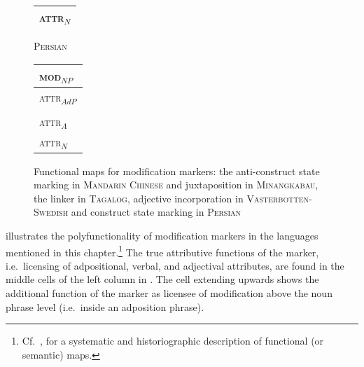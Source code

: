 \begin{figure}
{\begin{center}
\begin{tabular}{| l |}
\hline
\textsc{attr}$_{N}$\\
\hline
\end{tabular}
\end{center}
}
\parbox[b]{0.20\textwidth}{
\begin{center}\textsc{Persian}\\
\bigskip
\begin{tabular}{| l |}
\hline
\textsc{mod}$_{NP}$\\
\hline
\hline
\textsc{attr}$_{AdP}$\\
\hline
\\
\hline
\textsc{attr}$_{A}$\\
\hline
\textsc{attr}$_{N}$\\
\hline
\end{tabular}
\end{center}
}
\caption[Functional map for modification marking]{Functional maps for modification markers: the anti-construct state marking in \textsc{Mandarin Chinese} and juxtaposition in \textsc{Minangkabau}, the linker in \textsc{Tagalog}, adjective incorporation in \textsc{Västerbotten-Swedish} and construct state marking in \textsc{Persian}}
\end{figure}
 illustrates the polyfunctionality of modification markers in the languages mentioned in this chapter.\footnote{Cf.~\cite{haspelmath2003}, for a systematic and historiographic description of functional (or semantic) maps.} The true attributive functions of the marker, i.e.~licensing of adpositional, verbal, and adjectival attributes, are found in the middle cells of the left column in . The cell extending upwards shows the additional function of the marker as licensee of modification above the noun phrase level (i.e.~inside an adposition phrase).%

